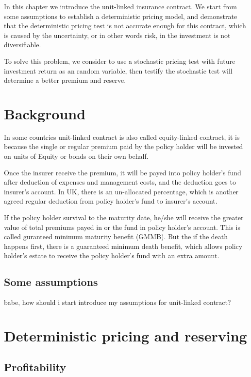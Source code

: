 \documentclass{report}
\begin{document}

In this chapter we introduce the unit-linked insurance contract. We start from some assumptions to establish a deterministic pricing model, and demonstrate that the deterministic pricing test is not accurate enough for this contract, which is caused by the uncertainty, or in other words risk, in the investment is not diversifiable.  

To solve this problem, we consider to use a stochastic pricing test with future investment return as an random variable, then testify the stochastic test will determine a better premium and reserve. 


\section{Background}

In some countries unit-linked contract is also called equity-linked contract, it is because the single or regular premium paid by the policy holder will be invested on units of Equity or bonds on their own behalf.


Once the insurer receive the premium, it will be payed into policy holder's fund after deduction of expenses and management costs, and the deduction goes to insurer's account. In UK, there is an un-allocated percentage, which is another agreed regular deduction from policy holder's fund to insurer's account.

 \cite{bib:GMMB}If the policy holder survival to the maturity date, he/she will receive the greater value of total premiums payed in or the fund in policy holder's account. This is called guranteed minimum maturity benefit (GMMB). But the if the death happens first, there is a guaranteed minimum death benefit, which allows policy holder's estate to receive the policy holder's fund with an extra amount. 


\subsection{Some assumptions}


babe, how should i start introduce my assumptions for unit-linked contract?


\section{Deterministic pricing and reserving}
\subsection{Profitability}
\end{document}
